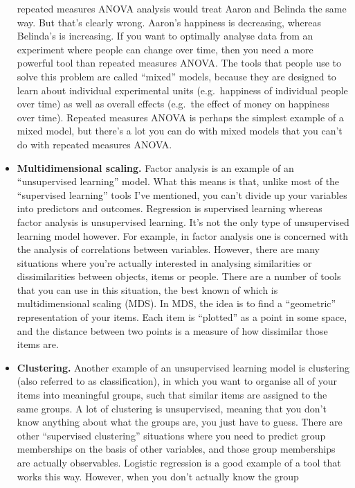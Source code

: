 \documentclass[
  a4paper,
]{book}
\begin{document}
\begin{itemize}
  repeated measures ANOVA analysis would treat Aaron and Belinda the
  same way. But that's clearly wrong. Aaron's happiness is decreasing,
  whereas Belinda's is increasing. If you want to optimally analyse data
  from an experiment where people can change over time, then you need a
  more powerful tool than repeated measures ANOVA. The tools that people
  use to solve this problem are called ``mixed'' models, because they
  are designed to learn about individual experimental units
  (e.g.~happiness of individual people over time) as well as overall
  effects (e.g.~the effect of money on happiness over time). Repeated
  measures ANOVA is perhaps the simplest example of a mixed model, but
  there's a lot you can do with mixed models that you can't do with
  repeated measures ANOVA.
\item
  \textbf{Multidimensional scaling.} Factor analysis is an example of an
  ``unsupervised learning'' model. What this means is that, unlike most
  of the ``supervised learning'' tools I've mentioned, you can't divide
  up your variables into predictors and outcomes. Regression is
  supervised learning whereas factor analysis is unsupervised learning.
  It's not the only type of unsupervised learning model however. For
  example, in factor analysis one is concerned with the analysis of
  correlations between variables. However, there are many situations
  where you're actually interested in analysing similarities or
  dissimilarities between objects, items or people. There are a number
  of tools that you can use in this situation, the best known of which
  is multidimensional scaling (MDS). In MDS, the idea is to find a
  ``geometric'' representation of your items. Each item is ``plotted''
  as a point in some space, and the distance between two points is a
  measure of how dissimilar those items are.
\item
  \textbf{Clustering.} Another example of an unsupervised learning model
  is clustering (also referred to as classification), in which you want
  to organise all of your items into meaningful groups, such that
  similar items are assigned to the same groups. A lot of clustering is
  unsupervised, meaning that you don't know anything about what the
  groups are, you just have to guess. There are other ``supervised
  clustering'' situations where you need to predict group memberships on
  the basis of other variables, and those group memberships are actually
  observables. Logistic regression is a good example of a tool that
  works this way. However, when you don't actually know the group

\end{itemize}
\end{document}
